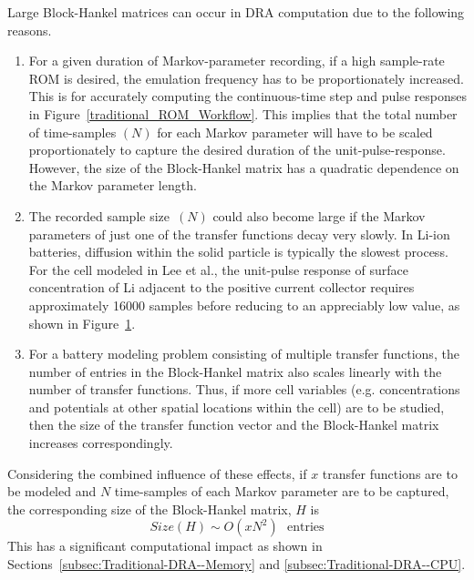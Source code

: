 Large Block-Hankel matrices can occur in DRA computation due to the
following reasons.
\begin{enumerate}
	\item For a given duration of Markov-parameter recording, if a high sample-rate
	ROM is desired, the emulation frequency has to be proportionately
	increased. This is for accurately computing the continuous-time step
	and pulse responses in Figure~\ref{traditional_ROM_Workflow}.
	This implies that the total number of time-samples $\left(N\right)$
	for each Markov parameter will have to be scaled proportionately to
	capture the desired duration of the unit-pulse-response. However,
	the size of the Block-Hankel matrix has a quadratic dependence on
	the Markov parameter length.
	\item The recorded sample size~$\left(N\right)$ could also become large
	if the Markov parameters of just one of the transfer functions decay
	very slowly. In Li-ion batteries, diffusion within the solid particle
	is typically the slowest process. For the cell modeled in Lee et al.,
	the unit-pulse response of surface concentration of Li adjacent to
	the positive current collector requires approximately 16000 samples
	before reducing to an appreciably low value, as shown in Figure~\ref{markov_cse_pos}.
	\item For a battery modeling problem consisting of multiple transfer functions,
	the number of entries in the Block-Hankel matrix also scales linearly
	with the number of transfer functions. Thus, if more cell variables
	(e.g. concentrations and potentials at other spatial locations within
	the cell) are to be studied, then the size of the transfer function
	vector and the Block-Hankel matrix increases correspondingly.
\end{enumerate}
Considering the combined influence of these effects, if $x$ transfer
functions are to be modeled and $N$ time-samples of each Markov parameter
are to be captured, the corresponding size of the Block-Hankel matrix,
$H$ is
\begin{equation}
Size(H)\sim O(xN^{2})\text{ {entries}}\label{eq:}
\end{equation}
This has a significant computational impact as shown in Sections~\ref{subsec:Traditional-DRA--Memory}
and \ref{subsec:Traditional-DRA--CPU}.
\begin{figure}
	\caption{}
	\label{markov_cse_pos}
\end{figure}

